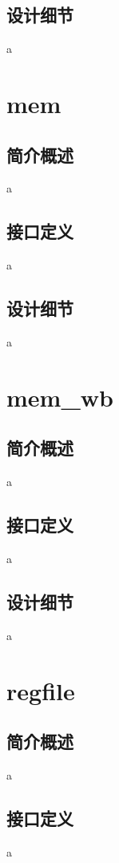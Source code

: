     \subsection{设计细节}
    a

\section{mem}

    \subsection{简介概述}
    a

    \subsection{接口定义}
    a

    \subsection{设计细节}
    a

\section{mem\_wb}

    \subsection{简介概述}
    a

    \subsection{接口定义}
    a

    \subsection{设计细节}
    a

\section{regfile}

    \subsection{简介概述}
    a

    \subsection{接口定义}
    a

